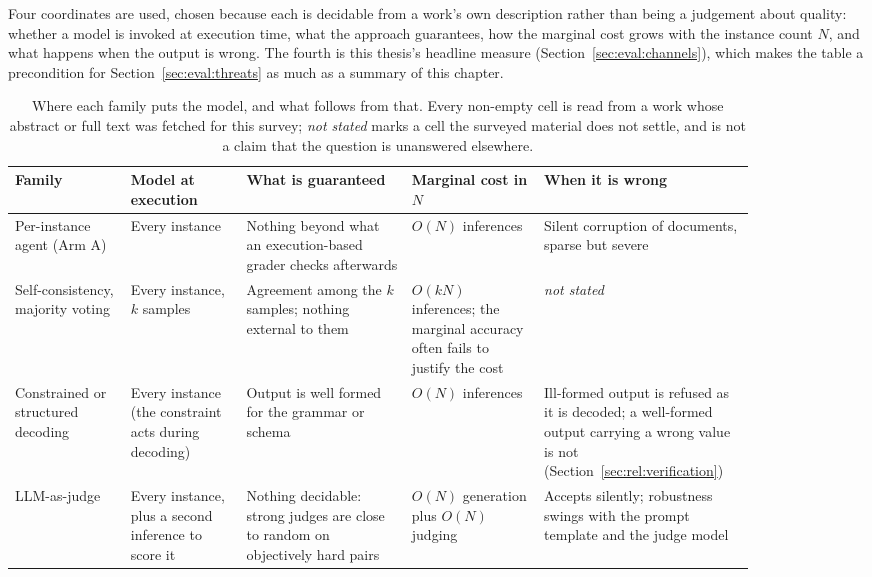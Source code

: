Four coordinates are used, chosen because each is decidable from a work's own description
rather than being a judgement about quality: whether a model is invoked at execution time,
what the approach guarantees, how the marginal cost grows with the instance count $N$, and
what happens when the output is wrong. The fourth is this thesis's headline measure
(Section~\ref{sec:eval:channels}), which makes the table a precondition for
Section~\ref{sec:eval:threats} as much as a summary of this chapter.

\begin{table}[p]
\centering
\scriptsize
\setlength{\tabcolsep}{3.5pt}
\caption{Where each family puts the model, and what follows from that. Every non-empty cell
is read from a work whose abstract or full text was fetched for this survey; \emph{not
stated} marks a cell the surveyed material does not settle, and is not a claim that the
question is unanswered elsewhere.}
\label{tab:rel:families}
\begin{tabular}{p{0.145\linewidth}p{0.145\linewidth}p{0.205\linewidth}p{0.165\linewidth}p{0.205\linewidth}}
\hline
\textbf{Family} & \textbf{Model at execution} & \textbf{What is guaranteed} &
\textbf{Marginal cost in $N$} & \textbf{When it is wrong} \\
\hline
Per-instance agent (Arm A)
& Every instance
& Nothing beyond what an execution-based grader checks afterwards
  \cite{xie2024osworld,lv2026mindthegap}
& $O(N)$ inferences
& Silent corruption of documents, sparse but severe \cite{laban2026delegate} \\
\hline
Self-consistency, majority voting
& Every instance, $k$ samples
& Agreement among the $k$ samples; nothing external to them
  \cite{wang2023selfconsistency}
& $O(kN)$ inferences; the marginal accuracy often fails to justify the cost
  \cite{erol2025costofpass}
& \emph{not stated} \\
\hline
Constrained or structured decoding
& Every instance (the constraint acts during decoding)
& Output is well formed for the grammar or schema \cite{scholak2021picard}
& $O(N)$ inferences
& Ill-formed output is refused as it is decoded; a well-formed output carrying a wrong value
  is not (Section~\ref{sec:rel:verification}) \\
\hline
LLM-as-judge
& Every instance, plus a second inference to score it
& Nothing decidable: strong judges are close to random on objectively hard pairs
  \cite{tan2025judgebench}
& $O(N)$ generation plus $O(N)$ judging
& Accepts silently; robustness swings with the prompt template and the judge model

\end{tabular}
\end{table}

